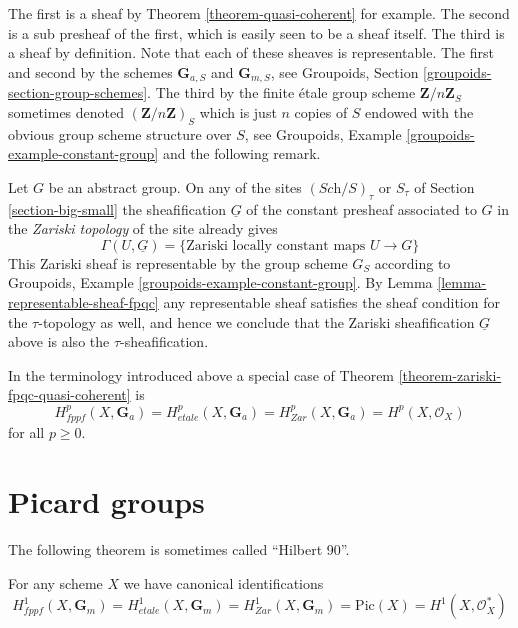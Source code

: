 \noindent
The first is a sheaf by
Theorem \ref{theorem-quasi-coherent}
for example. The second is a sub presheaf of the first, which is easily seen
to be a sheaf itself. The third is a sheaf by definition.
Note that each of these sheaves is representable.
The first and second by the schemes $\mathbf{G}_{a, S}$ and
$\mathbf{G}_{m, S}$, see
Groupoids, Section \ref{groupoids-section-group-schemes}.
The third by the finite \'etale group scheme $\mathbf{Z}/n\mathbf{Z}_S$
sometimes denoted $(\mathbf{Z}/n\mathbf{Z})_S$
which is just $n$ copies of $S$ endowed
with the obvious group scheme structure over $S$, see
Groupoids, Example \ref{groupoids-example-constant-group}
and the following remark.

\begin{remark}
\label{remark-constant-locally-constant-maps}
Let $G$ be an abstract group.
On any of the sites $(\textit{Sch}/S)_\tau$ or $S_\tau$ of
Section \ref{section-big-small}
the sheafification $\underline{G}$
of the constant presheaf associated to $G$ in the
{\it Zariski topology} of the site already gives 
$$
\Gamma(U, \underline{G}) =
\{\text{Zariski locally constant maps }U \to G\}
$$
This Zariski sheaf is representable by the group scheme $G_S$ according to 
Groupoids, Example \ref{groupoids-example-constant-group}.
By
Lemma \ref{lemma-representable-sheaf-fpqc}
any representable sheaf satisfies the sheaf condition for the $\tau$-topology
as well, and hence we conclude that the Zariski sheafification $\underline{G}$
above is also the $\tau$-sheafification.
\end{remark}

\begin{remark}
\label{remark-special-case-fpqc-cohomology-quasi-coherent}
In the terminology introduced above a special case of
Theorem \ref{theorem-zariski-fpqc-quasi-coherent}
is
$$
H_{fppf}^p(X, \mathbf{G}_a) =
H_{etale}^p(X, \mathbf{G}_a) =
H_{Zar}^p(X, \mathbf{G}_a) =
H^p(X, \mathcal{O}_X)
$$
for all $p \geq 0$.
\end{remark}




\section{Picard groups}
\label{section-picard-groups}

\noindent
The following theorem is sometimes called ``Hilbert 90''.

\begin{theorem}
\label{theorem-picard-group}
For any scheme $X$ we have canonical identifications
$$
H_{fppf}^1(X, \mathbf{G}_m) =
H_{etale}^1(X, \mathbf{G}_m) =
H^1_{Zar}(X, \mathbf{G}_m) =
\text{Pic}(X) =
H^1(X, \mathcal{O}_X^*)
$$
\end{theorem}

